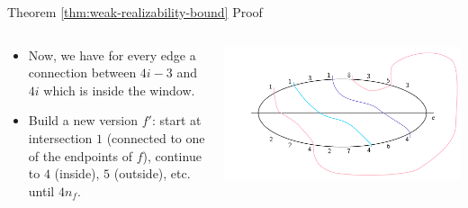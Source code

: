 \documentclass[10pt,aspectratio=169]{beamer}
\theoremstyle{plain}
\begin{document}
\begin{frame}{Theorem \ref{thm:weak-realizability-bound} Proof}
    \begin{columns}
    \begin{column}{0.35\textwidth}
        \begin{itemize}
            \item Now, we have for every edge a connection between \(4i-3\) and \(4i\) which is inside the window.
            \item<2-> Build a new version \(f'\): start at intersection \(1\) (connected to one of the endpoints of \(f\)), continue to \(4\) (inside), \(5\) (outside), etc. until \(4 n_f\).            
        \end{itemize}
    \end{column}
    \begin{column}{0.65\textwidth}
        \begin{center}
            \includegraphics[width=\textwidth]{images/figure-9.pdf}
        \end{center}
    \end{column}
    \end{columns}
\end{frame}
\end{document}
